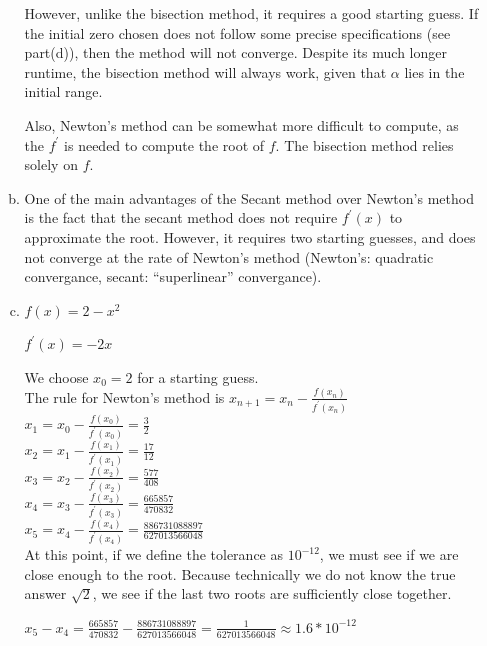 \documentclass[11pt]{article}
\begin{document}
\begin{enumerate}
\begin{enumerate}[(a)]
		However, unlike the bisection method, it requires a good starting guess. If
		the initial zero chosen does not follow some precise specifications (see part(d)), then the method will not converge. Despite
		its much longer runtime, the bisection method will always work, given that $\alpha$ lies in the initial range.

		Also, Newton's method can be somewhat more difficult to compute, as the $f^{'}$ is needed to compute the root of $f$. The
		bisection method relies solely on $f$. \\

		\item One of the main advantages of the Secant method over Newton's method is the fact that the secant method does not require
		$f^{'}(x)$ to approximate the root. However, it requires two starting guesses, and does not converge at the rate of
		Newton's method (Newton's: quadratic convergance, secant: ``superlinear'' convergance).


		\item $f(x) = 2-x^2$

		$f^{'}(x) = -2x$

		We choose $x_0=2$ for a starting guess. \\

		The rule for Newton's method is $x_{n+1} = x_n-\frac{f(x_n)}{f^{'}(x_n)}$ \\

		$x_1 = x_0 - \frac{f(x_0)}{f^{'}(x_0)} = \frac{3}{2}$ \\

		$x_2 = x_1 - \frac{f(x_1)}{f^{'}(x_1)} = \frac{17}{12}$ \\

		$x_3 = x_2 - \frac{f(x_2)}{f^{'}(x_2)} = \frac{577}{408}$ \\

		$x_4 = x_3 - \frac{f(x_3)}{f^{'}(x_3)} = \frac{665857}{470832}$ \\

		$x_5 = x_4 - \frac{f(x_4)}{f^{'}(x_4)} = \frac{886731088897}{627013566048}$ \\

		At this point, if we define the tolerance as $10^{-12}$, we must see if we are close enough to the root. Because technically
		we do not know the true answer $\sqrt{2}$, we see if the last two roots are sufficiently close together.

		$x_5 - x_4 = \frac{665857}{470832} - \frac{886731088897}{627013566048} = \frac{1}{627013566048} \approx 1.6*10^{-12}$


\end{enumerate}
\end{enumerate}
\end{document}

